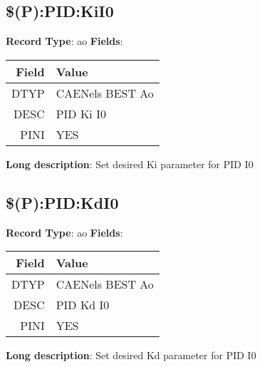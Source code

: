 \subsection{\$(P):PID:KiI0}
\textbf{Record Type}: ao \newline \newline 
\textbf{Fields}: \newline 
\begin{tabularx}{0.7\linewidth}{|r|X|}
\hline Field & Value \\
\hline
\hline
DTYP & CAENels BEST Ao\\
\hline
DESC & PID Ki I0\\
\hline
PINI & YES\\
\hline
\end{tabularx}
\newline \newline \newline
\textbf{Long description}: \newline 
 Set desired Ki parameter for PID I0
\newline \newline

\subsection{\$(P):PID:KdI0}
\textbf{Record Type}: ao \newline \newline 
\textbf{Fields}: \newline 
\begin{tabularx}{0.7\linewidth}{|r|X|}
\hline Field & Value \\
\hline
\hline
DTYP & CAENels BEST Ao\\
\hline
DESC & PID Kd I0\\
\hline
PINI & YES\\
\hline
\end{tabularx}
\newline \newline \newline
\textbf{Long description}: \newline 
 Set desired Kd parameter for PID I0
\newline \newline

